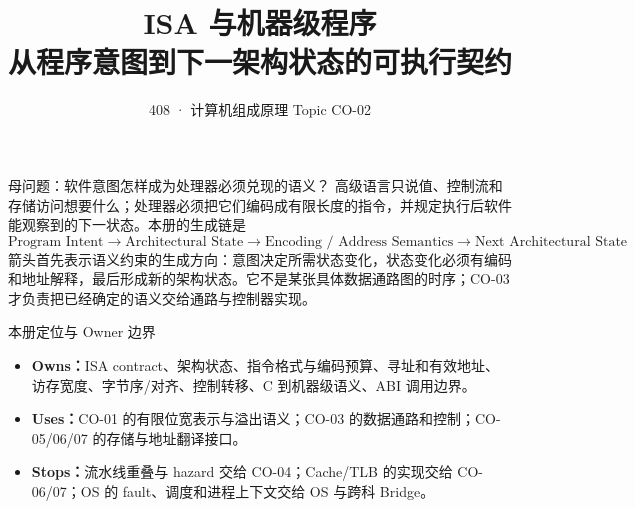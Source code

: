 \documentclass[UTF8,fontset=fandol,11pt,a4paper]{ctexart}
\title{\vspace{-1.1cm}\textbf{ISA 与机器级程序}\\[0.4em]
\large 从程序意图到下一架构状态的可执行契约}
\author{408 · 计算机组成原理 Topic CO-02}
\date{}
\newcommand{\kw}[1]{\textbf{\color{deep}#1}}
\begin{document}
\maketitle

\begin{corebox}{母问题：软件意图怎样成为处理器必须兑现的语义？}
高级语言只说值、控制流和存储访问想要什么；处理器必须把它们编码成有限长度的指令，并规定执行后软件能观察到的下一状态。本册的生成链是
\[
\boxed{\text{Program Intent}
\to\text{Architectural State}
\to\text{Encoding / Address Semantics}
\to\text{Next Architectural State}}
\]
箭头首先表示语义约束的生成方向：意图决定所需状态变化，状态变化必须有编码和地址解释，最后形成新的架构状态。它不是某张具体数据通路图的时序；CO-03 才负责把已经确定的语义交给通路与控制器实现。
\end{corebox}

\begin{methodbox}{本册定位与 Owner 边界}
\begin{itemize}
  \item \kw{Owns：}ISA contract、架构状态、指令格式与编码预算、寻址和有效地址、访存宽度、字节序/对齐、控制转移、C 到机器级语义、ABI 调用边界。
  \item \kw{Uses：}CO-01 的有限位宽表示与溢出语义；CO-03 的数据通路和控制；CO-05/06/07 的存储与地址翻译接口。
  \item \kw{Stops：}流水线重叠与 hazard 交给 CO-04；Cache/TLB 的实现交给 CO-06/07；OS 的 fault、调度和进程上下文交给 OS 与跨科 Bridge。
\end{itemize}
\end{methodbox}

\begin{center}
\end{center}

\tableofcontents
\newpage
\end{document}
